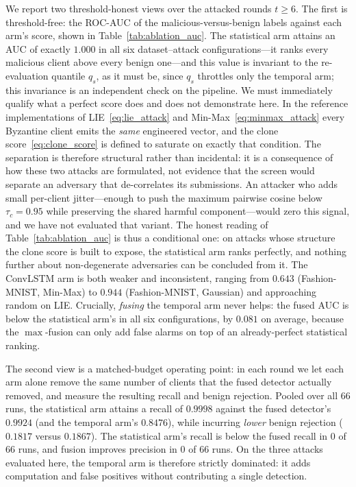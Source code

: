 \documentclass[journal]{IEEEtran}
\begin{document}
We report two threshold-honest views over the attacked rounds $t \ge 6$. The first is threshold-free: the ROC-AUC of the malicious-versus-benign labels against each arm's score, shown in Table~\ref{tab:ablation_auc}. The statistical arm attains an AUC of exactly $1.000$ in all six dataset--attack configurations---it ranks every malicious client above every benign one---and this value is invariant to the re-evaluation quantile $q_s$, as it must be, since $q_s$ throttles only the temporal arm; this invariance is an independent check on the pipeline. We must immediately qualify what a perfect score does and does not demonstrate here. In the reference implementations of LIE~\eqref{eq:lie_attack} and Min-Max~\eqref{eq:minmax_attack} every Byzantine client emits the \emph{same} engineered vector, and the clone score~\eqref{eq:clone_score} is defined to saturate on exactly that condition. The separation is therefore structural rather than incidental: it is a consequence of how these two attacks are formulated, not evidence that the screen would separate an adversary that de-correlates its submissions. An attacker who adds small per-client jitter---enough to push the maximum pairwise cosine below $\tau_c = 0.95$ while preserving the shared harmful component---would zero this signal, and we have not evaluated that variant. The honest reading of Table~\ref{tab:ablation_auc} is thus a conditional one: on attacks whose structure the clone score is built to expose, the statistical arm ranks perfectly, and nothing further about non-degenerate adversaries can be concluded from it. The ConvLSTM arm is both weaker and inconsistent, ranging from $0.643$ (Fashion-MNIST, Min-Max) to $0.944$ (Fashion-MNIST, Gaussian) and approaching random on LIE. Crucially, \emph{fusing} the temporal arm never helps: the fused AUC is below the statistical arm's in all six configurations, by $0.081$ on average, because the $\max$-fusion can only add false alarms on top of an already-perfect statistical ranking.

The second view is a matched-budget operating point: in each round we let each arm alone remove the same number of clients that the fused detector actually removed, and measure the resulting recall and benign rejection. Pooled over all $66$ runs, the statistical arm attains a recall of $0.9998$ against the fused detector's $0.9924$ (and the temporal arm's $0.8476$), while incurring \emph{lower} benign rejection ($0.1817$ versus $0.1867$). The statistical arm's recall is below the fused recall in $0$ of $66$ runs, and fusion improves precision in $0$ of $66$ runs. On the three attacks evaluated here, the temporal arm is therefore strictly dominated: it adds computation and false positives without contributing a single detection.
\end{document}
